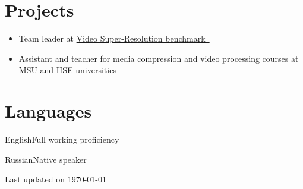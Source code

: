 \documentclass{tccv}
\newcommand{\updateinfo}[1][\today]{\par\vfill\hfill{\scriptsize\color{darkergray}Last updated on #1}}
\begin{document}
\section{Projects}

\begin{itemize}
     \item Team leader at \href{https://videoprocessing.ai/benchmarks/video-super-resolution.html}{Video Super-Resolution benchmark~\faExternalLink*}
     \item Assistant and teacher for media compression and video processing courses at MSU and HSE universities
\end{itemize}

\section{Languages}

\begin{factlist}
\item{English}{Full working proficiency}
\item{Russian}{Native speaker}
\end{factlist}

\nocite{kirillova2022erqa}
\nocite{lyapustin2022towards}

\printbibliography[title={Publications}]

\updateinfo
\end{document}
